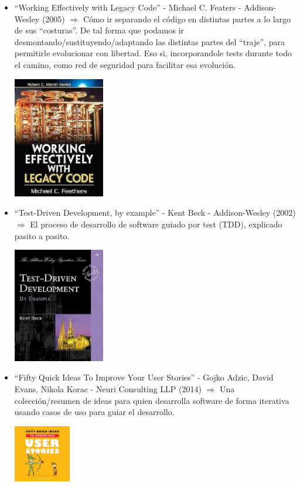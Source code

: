 \documentclass[spanish,12pt,a4paper,final,oneside]{book}
\begin{document}
\begin{itemize}
\item ``Working Effectively with Legacy Code'' - Michael C. Featers - Addison-Wesley (2005)  $\Rightarrow$ Cómo ir separando el código en distintas partes a lo largo de sus ``costuras''. De tal forma que podamos ir desmontando/sustituyendo/adaptando las distintas partes del ``traje'', para permitirle evolucionar con libertad. Eso si, incorporandole tests durante todo el camino, como red de seguridad para facilitar esa evolución.

\includegraphics[width=4cm]{portada-WorkingEffectiveyWithLegacyCode-MichaelCFeaters.jpg} 

\item ``Test-Driven Development, by example'' - Kent Beck - Addison-Wesley (2002) $\Rightarrow$ El proceso de desarrollo de software guiado por test (TDD), explicado pasito a pasito.

\includegraphics[width=4cm]{portada-TestDrivenDevelopment-KentBeck.jpg} 

\item ``Fifty Quick Ideas To Improve Your User Stories''  - Gojko Adzic, David Evans, Nikola Korac - Neuri Consulting LLP (2014) $\Rightarrow$ Una colección/resumen de ideas para quien desarrolla software de forma iterativa usando casos de uso para guiar el desarrollo.

\includegraphics[width=2.5cm]{portada-FiftyQuickIdeasToImproveYourUserStories-.jpg} 


\end{itemize}
\end{document}
